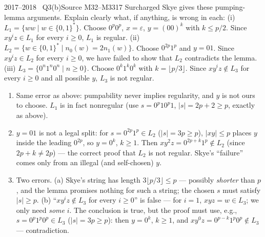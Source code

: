 \documentclass[11pt,a4paper]{article}
\newcommand{\eps}{\varepsilon}
\begin{document}
\begin{question}{2017--2018 \textbullet\ Q3(b)}{Source M32--M33}{17}
Surcharged Skye gives these pumping-lemma arguments. Explain clearly what, if anything, is wrong in each:
(i) $L_1=\{ww\mid w\in\{0,1\}^*\}$. Choose $0^p0^p$, $x=\eps$, $y=(00)^k$ with $k\le p/2$. Since $xy^iz\in L_1$ for every $i\ge0$, $L_1$ is regular.
(ii) $L_2=\{w\in\{0,1\}^*\mid n_0(w)=2n_1(w)\}$. Choose $0^{2p}1^p$ and $y=01$. Since $xy^iz\in L_2$ for every $i\ge0$, we have failed to show that $L_2$ contradicts the lemma.
(iii) $L_3=\{0^n1^n0^n\mid n\ge0\}$. Choose $0^k1^k0^k$ with $k=\lfloor p/3\rfloor$. Since $xy^iz\notin L_3$ for every $i\ge0$ and all possible $y$, $L_3$ is not regular.
\end{question}
\begin{solution}
\begin{enumerate}
\item Same error as above: pumpability never implies regularity, and $y$ is not ours to choose. $L_1$ is in fact nonregular (use $s=0^p10^p1$, $|s|=2p+2\ge p$, exactly as above).
\item $y=01$ is not a legal split: for $s=0^{2p}1^p\in L_2$ ($|s|=3p\ge p$), $|xy|\le p$ places $y$ inside the leading $0^{2p}$, so $y=0^k$, $k\ge1$. Then $xy^2z=0^{2p+k}1^p\notin L_2$ (since $2p+k\ne2p$) --- the correct proof that $L_2$ is not regular. Skye's ``failure'' comes only from an illegal (and self-chosen) $y$.
\item Two errors. (a) Skye's string has length $3\lfloor p/3\rfloor\le p$ --- possibly \emph{shorter} than $p$, and the lemma promises nothing for such a string; the chosen $s$ must satisfy $|s|\ge p$. (b) ``$xy^iz\notin L_3$ for every $i\ge0$'' is false --- for $i=1$, $xyz=w\in L_3$; we only need \emph{some} $i$. The conclusion is true, but the proof must use, e.g., $s=0^p1^p0^p\in L_3$ ($|s|=3p\ge p$): then $y=0^k$, $k\ge1$, and $xy^0z=0^{p-k}1^p0^p\notin L_3$ --- contradiction.
\end{enumerate}
\end{solution}
\end{document}
